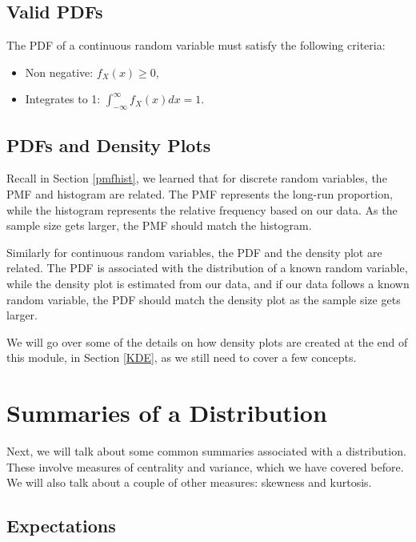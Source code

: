 \documentclass[
]{book}
\providecommand{\tightlist}{%
  \setlength{\itemsep}{0pt}\setlength{\parskip}{0pt}}
\begin{document}
\hypertarget{valid-pdfs}{%
\subsection{Valid PDFs}\label{valid-pdfs}}

The PDF of a continuous random variable must satisfy the following criteria:

\begin{itemize}
\tightlist
\item
  Non negative: \(f_X(x) \geq 0\),
\item
  Integrates to 1: \(\int_{-\infty}^{\infty}f_X(x) dx = 1\).
\end{itemize}

\hypertarget{pdfs-and-density-plots}{%
\subsection{PDFs and Density Plots}\label{pdfs-and-density-plots}}

Recall in Section \ref{pmfhist}, we learned that for discrete random variables, the PMF and histogram are related. The PMF represents the long-run proportion, while the histogram represents the relative frequency based on our data. As the sample size gets larger, the PMF should match the histogram.

Similarly for continuous random variables, the PDF and the density plot are related. The PDF is associated with the distribution of a known random variable, while the density plot is estimated from our data, and if our data follows a known random variable, the PDF should match the density plot as the sample size gets larger.

We will go over some of the details on how density plots are created at the end of this module, in Section \ref{KDE}, as we still need to cover a few concepts.

\hypertarget{summsDist}{%
\section{Summaries of a Distribution}\label{summsDist}}

Next, we will talk about some common summaries associated with a distribution. These involve measures of centrality and variance, which we have covered before. We will also talk about a couple of other measures: skewness and kurtosis.

\hypertarget{expectations-1}{%
\subsection{Expectations}\label{expectations-1}}
\end{document}
